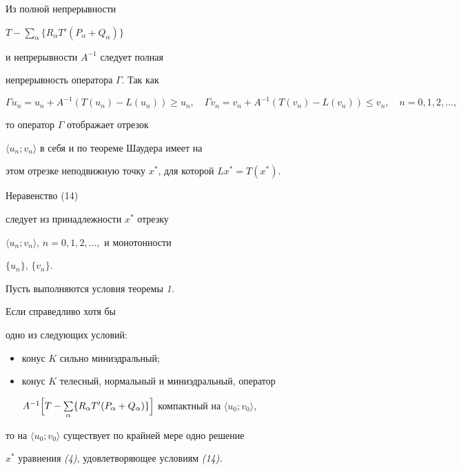 \begin{pf}
Из полной непрерывности


$T-\sum\limits_\alpha\{R_\alpha T'(P_\alpha+Q_\alpha)\}$


и непрерывности $A^{-1}$ следует полная


непрерывность оператора $\Gamma$. Так как


$$


\Gamma u_n=u_n+A^{-1}(T(u_n)-L(u_n))\ge u_n,\quad


\Gamma v_n=v_n+A^{-1}(T(v_n)-L(v_n))\le v_n,\quad


n=0,1,2,\dotsc,


$$


то оператор $\Gamma$ отображает отрезок


$\langle u_n;v_n\rangle$ в себя и по теореме Шаудера имеет на


этом отрезке неподвижную точку $x^*$, для которой $Lx^*=T(x^*)$.


Неравенство (14)


следует из принадлежности $x^*$ отрезку


$\langle u_n;v_n\rangle$, $n=0,1,2,\dotsc,$ и монотонности


$\{u_n\}$, $\{v_n\}$.


\end{pf}





\begin{thm} Пусть выполняются условия теоремы {\em 1.}


Если справедливо хотя бы


одно из следующих условий:


\begin{itemize}


\item[а)] конус $K$ сильно миниэдральный;


\item[б)] конус $K$ телесный, нормальный и миниэдральный, оператор


$A^{-1}\Bigl[T-\sum\limits_\alpha\{R_\alpha T'


(P_\alpha+Q_\alpha)\}\Bigr]$ компактный на $\langle u_0;v_0\rangle$,


\end{itemize}


то на $\langle u_0;v_0\rangle$ существует по крайней мере одно решение


$x^*$ уравнения {\em (4)}, удовлетворяющее условиям {\em (14).}


\end{thm}





